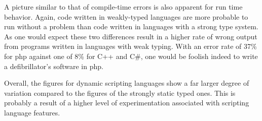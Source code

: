 \documentclass[10pt]{sigplanconf}
\begin{document}
A picture similar to that of compile-time errors
is also apparent for run time behavior.
Again, code written in weakly-typed languages are more probable to run without
a problem than code written in languages with a strong type system.
As one would expect these two differences result in a higher rate of
wrong output from programs written in languages with weak typing.
With an error rate of 37\% for {\sc php} against one of 8\% for
C++ and C\#, one would be foolish indeed to write a defibrillator's
software in {\sc php}.

Overall, the figures for dynamic scripting languages show a far larger
degree of variation compared to the figures of the strongly static typed
ones.
This is probably a result of a higher level of experimentation
associated with scripting language features.
\end{document}
